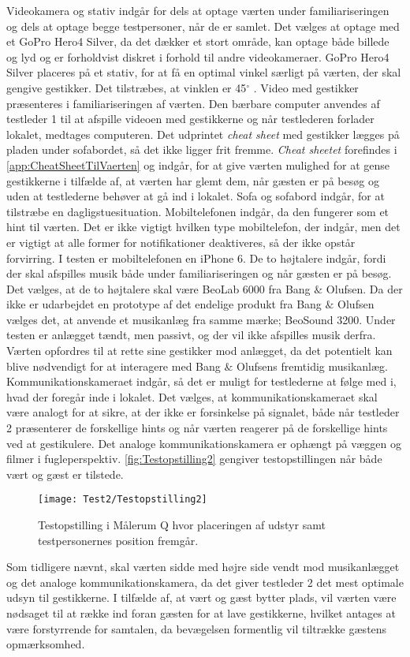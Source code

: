 Videokamera og stativ indgår for dels at optage værten under familiariseringen og dels at optage begge testpersoner, når de er samlet. Det vælges at optage med et GoPro Hero4 Silver, da det dækker et stort område, kan optage både billede og lyd og er forholdvist diskret i forhold til andre videokameraer. GoPro Hero4 Silver placeres på et stativ, for at få en optimal vinkel særligt på værten, der skal gengive gestikker. Det tilstræbes, at vinklen er 45$^{\circ}$ . Video med gestikker præsenteres i familiariseringen af værten. Den bærbare computer anvendes af testleder 1 til at afspille videoen med gestikkerne og når testlederen forlader lokalet, medtages computeren. Det udprintet \textit{cheat sheet} med gestikker lægges på pladen under sofabordet, så det ikke ligger frit fremme. \textit{Cheat sheetet} forefindes i \autoref{app:CheatSheetTilVaerten} og indgår, for at give værten mulighed for at gense gestikkerne i tilfælde af, at værten har glemt dem, når gæsten er på besøg og uden at testlederne behøver at gå ind i lokalet. Sofa og sofabord indgår, for at tilstræbe en dagligstuesituation. Mobiltelefonen indgår, da den fungerer som et hint til værten. Det er ikke vigtigt hvilken type mobiltelefon, der indgår, men det er vigtigt at alle former for notifikationer deaktiveres, så der ikke opstår forvirring. I testen er mobiltelefonen en iPhone 6. De to højtalere indgår, fordi der skal afspilles musik både under familiariseringen og når gæsten er på besøg. Det vælges, at de to højtalere skal være BeoLab 6000 fra Bang $\&$ Olufsen. Da der ikke er udarbejdet en prototype af det endelige produkt fra Bang $\&$ Olufsen vælges det, at anvende et musikanlæg fra samme mærke; BeoSound 3200. Under testen er anlægget tændt, men passivt, og der vil ikke afspilles musik derfra. Værten opfordres til at rette sine gestikker mod anlægget, da det potentielt kan blive nødvendigt for at interagere med Bang $\&$ Olufsens fremtidig musikanlæg. Kommunikationskameraet indgår, så det er muligt for testlederne at følge med i, hvad der foregår inde i lokalet. Det vælges, at kommunikationskameraet skal være analogt for at sikre, at der ikke er forsinkelse på signalet, både når testleder 2 præsenterer de forskellige hints og når værten reagerer på de forskellige hints ved at gestikulere. Det analoge kommunikationskamera er ophængt på væggen og filmer i fugleperspektiv. \autoref{fig:Testopstilling2} gengiver testopstillingen når både vært og gæst er tilstede. 
%
\begin{figure}[H]
	\centering
	\texttt{[image: Test2/Testopstilling2]}
	\caption{Testopstilling i Målerum Q hvor placeringen af udstyr samt testpersonernes position fremgår.}
	\label{fig:Testopstilling2}
\end{figure}
\noindent
%
Som tidligere nævnt, skal værten sidde med højre side vendt mod musikanlægget og det analoge kommunikationskamera, da det giver testleder 2 det mest optimale udsyn til gestikkerne. I tilfælde af, at vært og gæst bytter plads, vil værten være nødsaget til at række ind foran gæsten for at lave gestikkerne, hvilket antages at være forstyrrende for samtalen, da bevægelsen formentlig vil tiltrække gæstens opmærksomhed. 

